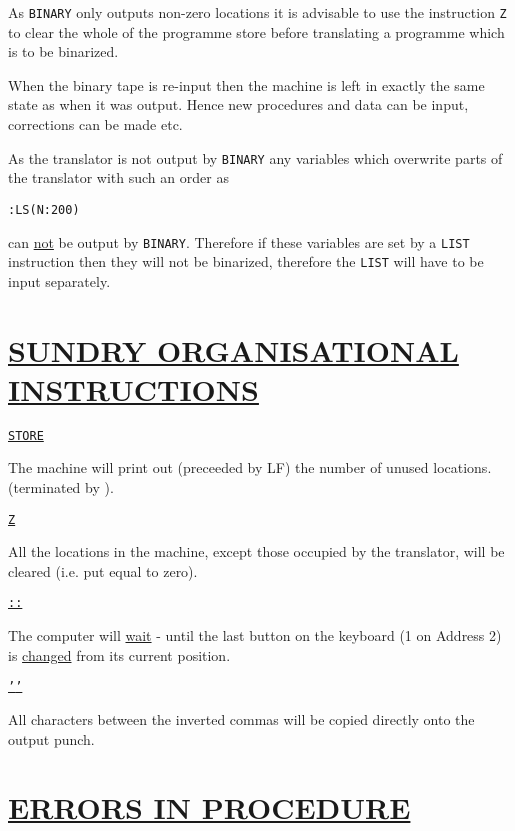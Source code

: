 \documentclass[10pt, a4paper, oneside]{article}
\newcommand{\myuline}[1]{\uline{#1}}
\newcommand{\mytt}[1]{\texttt{\scriptsize #1}}
\newcommand{\mytt}[1]{\texttt{\small #1}}
\begin{document}
\begin{multicols}{2}
As \mytt{BINARY} only outputs non-zero locations it is
advisable to use the instruction \mytt{Z} to clear the whole
of the programme store before translating a programme
which is to be binarized.

When the binary tape is re-input then the machine
is left in exactly the same state as when it was
output.  Hence new procedures and data can be input,
corrections can be made etc.

As the translator is not output by \mytt{BINARY} any
variables which overwrite parts of the translator with
such an order as

\begin{addmargin}[1cm]{1em}%
\begin{lstlisting}
:LS(N:200)
\end{lstlisting}
\end{addmargin}

can \myuline{not} be output by \mytt{BINARY}.  Therefore if these
variables are set by a \mytt{LIST} instruction then they will not
be binarized, therefore the \mytt{LIST} will have to be
input separately.

\section{\myuline{SUNDRY ORGANISATIONAL INSTRUCTIONS}}

\hspace{\parindent}\myuline{\mytt{STORE}}

The machine will print out (preceeded by LF) the
number of unused locations.  (terminated by \mytt{*}).

\myuline{\mytt{Z}}

All the locations in the machine, except those
occupied by the translator, will be cleared (i.e.
put equal to zero).

\myuline{\mytt{::}}

The computer will \myuline{wait} - until the last button on
the keyboard (1 on Address 2) is \myuline{changed} from its
current position.

\myuline{\mytt{'}\hspace{0.5cm}\mytt{'}}

All characters between the inverted commas will be
copied directly onto the output punch.


\section{\myuline{ERRORS IN PROCEDURE}}


\end{multicols}
\end{document}
